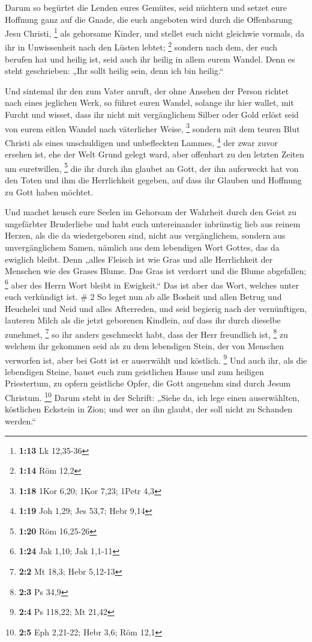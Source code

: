  Darum so begürtet die Lenden eures Gemütes, seid
nüchtern und setzet eure Hoffnung ganz auf die Gnade, die euch angeboten
wird durch die Offenbarung Jesu Christi, \footnote{\textbf{1:13} Lk
  12,35-36}  als gehorsame Kinder, und stellet euch nicht
gleichwie vormals, da ihr in Unwissenheit nach den Lüsten lebtet;
\footnote{\textbf{1:14} Röm 12,2}  sondern nach dem, der
euch berufen hat und heilig ist, seid auch ihr heilig in allem eurem
Wandel.  Denn es steht geschrieben: „Ihr sollt heilig
sein, denn ich bin heilig.``

 Und sintemal ihr den zum Vater anruft, der ohne Ansehen
der Person richtet nach eines jeglichen Werk, so führet euren Wandel,
solange ihr hier wallet, mit Furcht  und wisset, dass ihr
nicht mit vergänglichem Silber oder Gold erlöst seid von eurem eitlen
Wandel nach väterlicher Weise, \footnote{\textbf{1:18} 1Kor 6,20; 1Kor
  7,23; 1Petr 4,3}  sondern mit dem teuren Blut Christi
als eines unschuldigen und unbefleckten Lammes, \footnote{\textbf{1:19}
  Joh 1,29; Jes 53,7; Hebr 9,14}  der zwar zuvor ersehen
ist, ehe der Welt Grund gelegt ward, aber offenbart zu den letzten
Zeiten um euretwillen, \footnote{\textbf{1:20} Röm 16,25-26}
 die ihr durch ihn glaubet an Gott, der ihn auferweckt
hat von den Toten und ihm die Herrlichkeit gegeben, auf dass ihr Glauben
und Hoffnung zu Gott haben möchtet.

 Und machet keusch eure Seelen im Gehorsam der Wahrheit
durch den Geist zu ungefärbter Bruderliebe und habt euch untereinander
inbrünstig lieb aus reinem Herzen,  als die da
wiedergeboren sind, nicht aus vergänglichem, sondern aus unvergänglichem
Samen, nämlich aus dem lebendigen Wort Gottes, das da ewiglich bleibt.
 Denn „alles Fleisch ist wie Gras und alle Herrlichkeit
der Menschen wie des Grases Blume. Das Gras ist verdorrt und die Blume
abgefallen; \footnote{\textbf{1:24} Jak 1,10; Jak 1,1-11}
 aber des Herrn Wort bleibt in Ewigkeit.`` Das ist aber
das Wort, welches unter euch verkündigt ist. \# 2  So
leget nun ab alle Bosheit und allen Betrug und Heuchelei und Neid und
alles Afterreden,  und seid begierig nach der
vernünftigen, lauteren Milch als die jetzt geborenen Kindlein, auf dass
ihr durch dieselbe zunehmet, \footnote{\textbf{2:2} Mt 18,3; Hebr
  5,12-13}  so ihr anders geschmeckt habt, dass der Herr
freundlich ist, \footnote{\textbf{2:3} Ps 34,9}  zu
welchem ihr gekommen seid als zu dem lebendigen Stein, der von Menschen
verworfen ist, aber bei Gott ist er auserwählt und köstlich. \footnote{\textbf{2:4}
  Ps 118,22; Mt 21,42}  Und auch ihr, als die lebendigen
Steine, bauet euch zum geistlichen Hause und zum heiligen Priestertum,
zu opfern geistliche Opfer, die Gott angenehm sind durch Jesum Christum.
\footnote{\textbf{2:5} Eph 2,21-22; Hebr 3,6; Röm 12,1} 
Darum steht in der Schrift: „Siehe da, ich lege einen auserwählten,
köstlichen Eckstein in Zion; und wer an ihn glaubt, der soll nicht zu
Schanden werden.``

